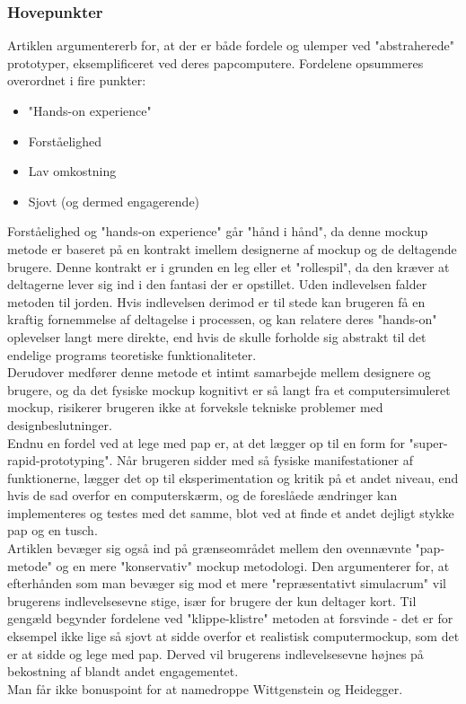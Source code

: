 \documentclass[11pt]{article}
\begin{document}
\subsubsection{Hovepunkter}
Artiklen argumentererb for, at der er både fordele og ulemper ved "abstraherede" prototyper, eksemplificeret ved deres papcomputere. Fordelene opsummeres overordnet i fire punkter:
\begin{itemize}
\item "Hands-on experience"
\item Forståelighed
\item Lav omkostning
\item Sjovt (og dermed engagerende)
\end{itemize}
Forståelighed og "hands-on experience" går "hånd i hånd", da denne mockup metode er baseret på en kontrakt imellem designerne af mockup og de deltagende brugere. Denne kontrakt er i grunden en leg eller et "rollespil", da den kræver at deltagerne lever sig ind i den fantasi der er opstillet. Uden indlevelsen falder metoden til jorden. Hvis indlevelsen derimod er til stede kan brugeren få en kraftig fornemmelse af deltagelse i processen, og kan relatere deres "hands-on" oplevelser langt mere direkte, end hvis de skulle forholde sig abstrakt til det endelige programs teoretiske funktionaliteter.\\
Derudover medfører denne metode et intimt samarbejde mellem designere og brugere, og da det fysiske mockup kognitivt er så langt fra et computersimuleret mockup, risikerer brugeren ikke at forveksle tekniske problemer med designbeslutninger.\\
Endnu en fordel ved at lege med pap er, at det lægger op til en form for "super-rapid-prototyping". Når brugeren sidder med så fysiske manifestationer af funktionerne, lægger det op til eksperimentation og kritik på et andet niveau, end hvis de sad overfor en computerskærm, og de foreslåede ændringer kan implementeres og testes med det samme, blot ved at finde et andet dejligt stykke pap og en tusch.\\
Artiklen bevæger sig også ind på grænseområdet mellem den ovennævnte "pap-metode" og en mere "konservativ" mockup metodologi. Den argumenterer for, at efterhånden som man bevæger sig mod et mere "repræsentativt simulacrum" vil brugerens indlevelsesevne stige, især for brugere der kun deltager kort. Til gengæld begynder fordelene ved "klippe-klistre" metoden at forsvinde - det er for eksempel ikke lige så sjovt at sidde overfor et realistisk computermockup, som det er at sidde og lege med pap. Derved vil brugerens indlevelsesevne højnes på bekostning af blandt andet engagementet.\\
Man får ikke bonuspoint for at namedroppe Wittgenstein og Heidegger.
\end{document}
